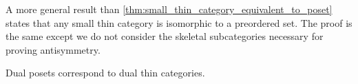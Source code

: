 \begin{note}\label{note:small_thin_category_isomorphic_to_preorder}
  A more general result than \cref{thm:small_thin_category_equivalent_to_poset} states that any small thin category is isomorphic to a preordered set. The proof is the same except we do not consider the skeletal subcategories necessary for proving antisymmetry.
\end{note}

\begin{proposition}\label{thm:dual_poset_dual_thin_category}
  Dual posets correspond to dual thin categories.
\end{proposition}
